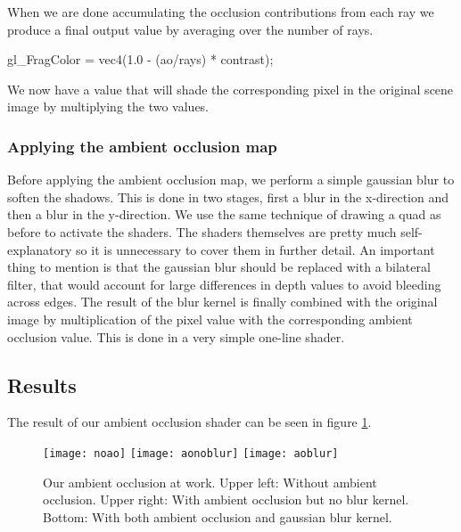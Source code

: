 When we are done accumulating the occlusion contributions from each
ray we produce a final output value by averaging over the number of
rays.
\begin{cppcode}
  gl_FragColor = vec4(1.0 - (ao/rays) * contrast);
\end{cppcode}
We now have a value that will shade the corresponding pixel in the
original scene image by multiplying the two values.

\subsubsection*{Applying the ambient occlusion map}
Before applying the ambient occlusion map, we perform a simple gaussian
blur to soften the shadows. This is done in two stages, first a blur
in the x-direction and then a blur in the y-direction. We use the same
technique of drawing a quad as before to activate the shaders. The
shaders themselves are pretty much self-explanatory so it is
unnecessary to cover them in further detail. An important thing to
mention is that the gaussian blur should be replaced with a bilateral
filter, that would account for large differences in depth values to
avoid bleeding across edges. The result of the blur kernel is finally
combined with the original image by multiplication of the pixel value
with the corresponding ambient occlusion value. This is done in a very
simple one-line shader.

\subsection{Results}

The result of our ambient occlusion shader can be seen in figure
\ref{fig:res}. 

\begin{figure}[h]
\label{fig:res}
  \centering
  \texttt{[image: noao]}
  \texttt{[image: aonoblur]}
  \texttt{[image: aoblur]}
  \caption{Our ambient occlusion at work. Upper left: Without ambient
    occlusion. Upper right: With ambient occlusion but no blur
    kernel. Bottom: With both ambient occlusion and gaussian blur kernel.}
\end{figure}

